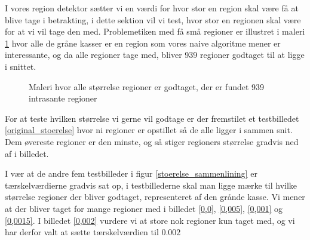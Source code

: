 {\sffamily
I vores region detektor sætter vi en værdi for hvor stor en region skal
være få at blive tage i betrakting, i dette sektion vil vi test,
hvor stor en regionen skal være for at vi vil tage den med. Problemetiken
med få små regioner er illustret i maleri \ref{alt_med} hvor alle de
gråne kasser er en region som vores naive algoritme mener er
interessante, og da alle regioner tage med, bliver 939 regioner godtaget
til at ligge i snittet. 
}

\begin{figure}[¡h]
    \setlength\fboxsep{0pt}
    \setlength\fboxrule{0.5pt}
    \begin{center}
    \end{center}
    \caption{Maleri hvor alle størrelse regioner er godtaget, der er fundet 939 intrasante regioner}
	\label{alt_med}
\end{figure}

For at teste hvilken størrelse vi gerne vil godtage er der fremstilet et
testbilledet \ref{original_stoerelse} hvor ni regioner er opstillet så de
alle ligger i sammen snit. Dem øvereste regioner er den minste, og så
stiger regioners størrelse gradvis ned af i billedet.

I vær at de andre fem testbilleder i figur \ref{stoerelse_sammenlining}
er tærskelværdierne gradvis sat op, i testbillederne skal man ligge
mærke til hvilke størrelse regioner der bliver godtaget, representeret
af den grånde kasse. Vi mener at der bliver taget for mange regioner med
i billedet \ref{0,0}, \ref{0,005}, \ref{0,001} og \ref{0,0015}. I
billedet \ref{0,002} vurdere vi at store nok regioner kun taget med, og
vi har derfor valt at sætte tærskelværdien til $0.002$
 
